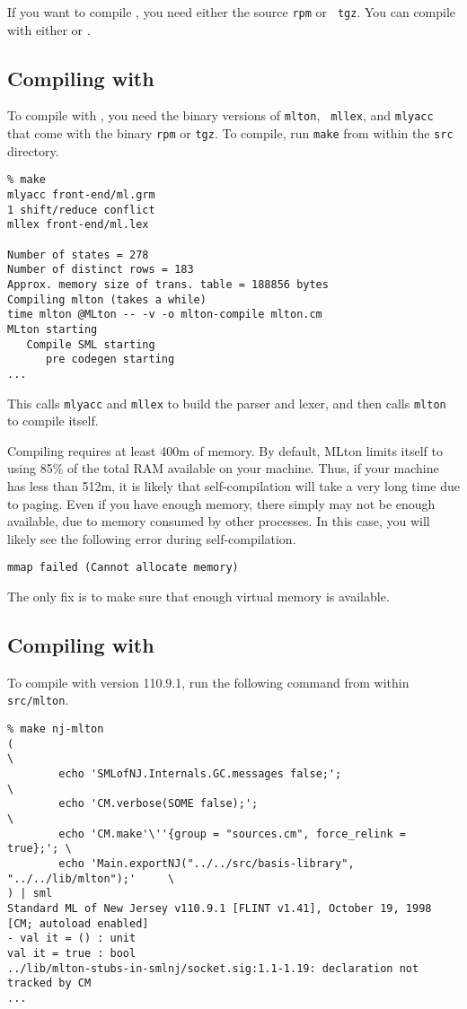 
If you want to compile {\mlton}, you need either the source {\tt rpm} or {\tt
tgz}.  You can compile with either {\mlton} or {\smlnj}.

\subsection{Compiling with {\mlton}}

To compile with {\mlton}, you need the binary versions of {\tt mlton}, {\tt
mllex}, and {\tt mlyacc} that come with the binary {\tt rpm} or {\tt tgz}.  To
compile, run {\tt make} from within the {\tt src} directory.
\begin{verbatim}
% make
mlyacc front-end/ml.grm
1 shift/reduce conflict
mllex front-end/ml.lex

Number of states = 278
Number of distinct rows = 183
Approx. memory size of trans. table = 188856 bytes
Compiling mlton (takes a while)
time mlton @MLton -- -v -o mlton-compile mlton.cm
MLton starting
   Compile SML starting
      pre codegen starting
...
\end{verbatim}
This calls {\tt mlyacc} and {\tt mllex} to build the parser and lexer, and then
calls {\tt mlton} to compile itself.

Compiling {\mlton} requires at least 400m of memory.  By default, MLton limits
itself to using 85\% of the total RAM available on your machine.  Thus, if your
machine has less than 512m, it is likely that self-compilation will take a very
long time due to paging.  Even if you have enough memory, there simply may not
be enough available, due to memory consumed by other processes.  In this case,
you will likely see the following error during self-compilation.
\begin{verbatim}
mmap failed (Cannot allocate memory)
\end{verbatim}
The only fix is to make sure that enough virtual memory is available.

\subsection{Compiling with {\smlnj}}

To compile with {\smlnj} version 110.9.1, run the following command from within
{\tt src/mlton}.
\begin{verbatim}
% make nj-mlton
(                                                                       \
        echo 'SMLofNJ.Internals.GC.messages false;';                    \
        echo 'CM.verbose(SOME false);';                                 \
        echo 'CM.make'\''{group = "sources.cm", force_relink = true};'; \
        echo 'Main.exportNJ("../../src/basis-library", "../../lib/mlton");'     \
) | sml
Standard ML of New Jersey v110.9.1 [FLINT v1.41], October 19, 1998 [CM; autoload enabled]
- val it = () : unit
val it = true : bool
../lib/mlton-stubs-in-smlnj/socket.sig:1.1-1.19: declaration not tracked by CM
...
\end{verbatim}
